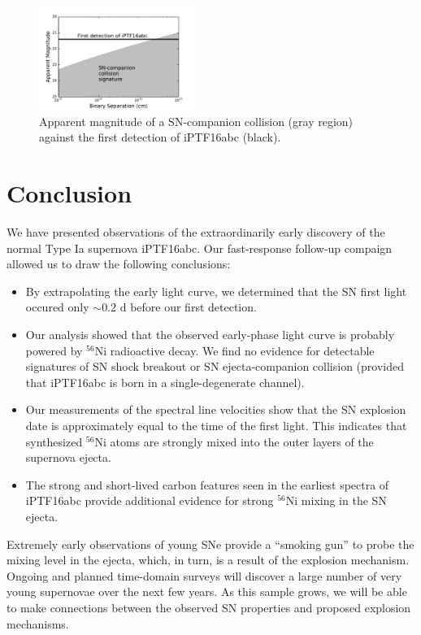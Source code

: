 \documentclass[twocolumn]{aastex61}
\begin{document}
\begin{figure}[!thb]
  \centering
  \includegraphics[width=0.45\textwidth]{SNCompanion.pdf}
  \caption{Apparent magnitude of a SN-companion collision (gray region)
    against the first detection of iPTF16abc (black).}
  \label{fig:SN-companion}
\end{figure}

\section{Conclusion}
\label{sec:conclusion}

We have presented observations of the extraordinarily early discovery of the 
normal Type Ia supernova iPTF16abc. Our fast-response follow-up 
compaign allowed us to draw the following conclusions:
\begin{itemize}
\item By extrapolating the early light curve, we determined that the
  SN first light occured only $\sim{0.2}$ d before our
  first detection.
\item Our analysis showed that the observed early-phase light curve is
  probably powered by $^{56}$Ni radioactive decay. We find no 
  evidence for detectable signatures of SN
  shock breakout or SN ejecta-companion collision (provided that 
  iPTF16abc
  is born in a single-degenerate channel).
\item Our measurements of the spectral line velocities show that the
  SN explosion date is approximately equal to the time
  of the first light. This indicates that
  synthesized $^{56}$Ni atoms are strongly mixed into the 
  outer layers of
  the supernova ejecta.
\item The strong and short-lived carbon features seen in the 
  earliest spectra of iPTF16abc provide additional evidence
  for strong $^{56}$Ni mixing in the SN ejecta.  
\end{itemize}

Extremely early observations of young SNe provide a ``smoking
gun'' to probe the mixing level in the ejecta, which, in turn, is 
a result of the explosion mechanism. Ongoing and planned
time-domain surveys will discover a large number of very young supernovae over the next few years. As this sample grows, we will
be able to make connections between the observed SN properties and 
proposed explosion mechanisms.
\end{document}
